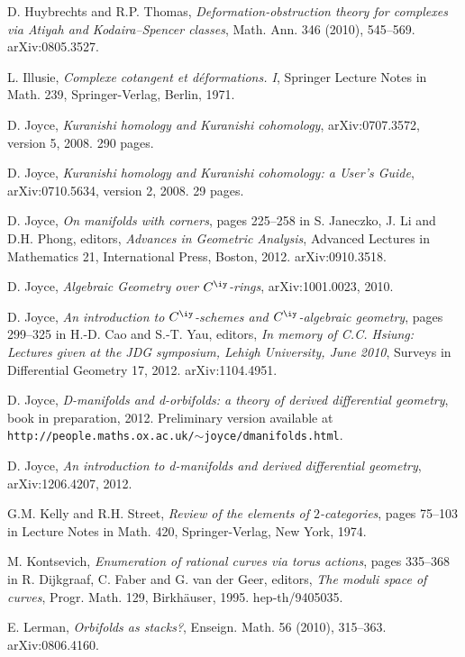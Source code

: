 \documentclass{article}
\begin{document}
\begin{thebibliography}{99}
 D. Huybrechts and R.P. Thomas, {\it
Deformation-obstruction theory for complexes via Atiyah and
Kodaira--Spencer classes}, Math. Ann. 346 (2010), 545--569.
arXiv:0805.3527.

 L. Illusie, {\it Complexe cotangent et
d\'eformations. I}, Springer Lecture Notes in Math. 239,
Springer-Verlag, Berlin, 1971.

 D. Joyce, {\it Kuranishi homology and Kuranishi
cohomology}, arXiv:0707.3572, version 5, 2008. 290 pages.

 D. Joyce, {\it Kuranishi homology and Kuranishi
cohomology: a User's Guide}, arXiv:0710.5634, version 2, 2008. 29
pages.

 D. Joyce, {\it On manifolds with corners}, pages
225--258 in S. Janeczko, J. Li and D.H. Phong, editors, {\it
Advances in Geometric Analysis}, Advanced Lectures in Mathematics
21, International Press, Boston, 2012. arXiv:0910.3518.

 D. Joyce, {\it Algebraic Geometry over\/
$C^\iy$-rings}, arXiv:1001.0023, 2010.

 D. Joyce, {\it An introduction to $C^\iy$-schemes
and\/ $C^\iy$-algebraic geometry}, pages 299--325 in H.-D. Cao and
S.-T. Yau, editors, {\it In memory of C.C. Hsiung: Lectures given at
the JDG symposium, Lehigh University, June 2010}, Surveys in
Differential Geometry 17, 2012. arXiv:1104.4951.

 D. Joyce, {\it D-manifolds and d-orbifolds: a theory of
derived differential geometry}, book in preparation, 2012.
Preliminary version available at {\tt
http://people.maths.ox.ac.uk/$\sim$joyce/dmanifolds.html}.

 D. Joyce, {\it An introduction to d-manifolds and
derived differential geometry}, arXiv:1206.4207, 2012.

 G.M. Kelly and R.H. Street, {\it Review of the elements
of\/ $2$-categories}, pages 75--103 in Lecture Notes in Math. 420,
Springer-Verlag, New York, 1974.

 M. Kontsevich, {\it Enumeration of rational curves
via torus actions}, pages 335--368 in R. Dijkgraaf, C. Faber and G.
van der Geer, editors, {\it The moduli space of curves}, Progr.
Math. 129, Birkh\"auser, 1995. hep-th/9405035.

 E. Lerman, {\it Orbifolds as stacks?},
Enseign. Math. 56 (2010), 315--363. arXiv:0806.4160.


\end{thebibliography}
\end{document}
